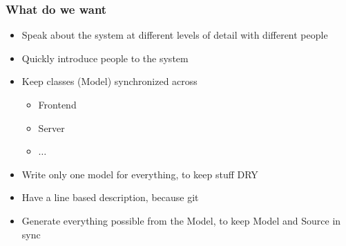 \documentclass[xelatex,10pt]{beamer}
\begin{document}
\begin{frame}
	\frametitle{What do we want}
	\begin{itemize}
		\item Speak about the system at different levels of detail
		with different people
		\item Quickly introduce people to the system
		\item Keep classes (Model) synchronized across
		\begin{itemize}
			\item Frontend
			\item Server
			\item \(\dots\)
		\end{itemize}
		\item Write only one model for everything, to keep stuff DRY
		\item Have a line based description, because git
		\item Generate everything possible from the Model, to keep Model and
Source in sync
	\end{itemize}
\end{frame}
\end{document}
